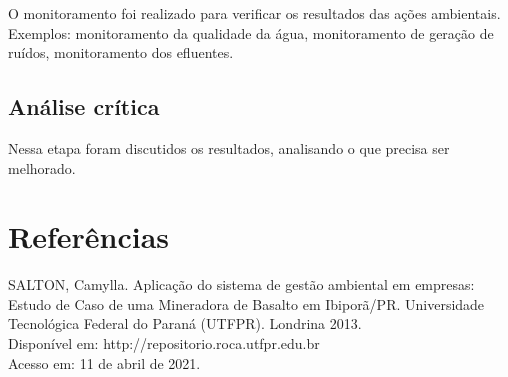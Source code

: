 \documentclass[a4paper, 12pt]{article}
\begin{document}
    \par O monitoramento foi realizado para verificar os resultados das ações ambientais. Exemplos: monitoramento da qualidade da água, monitoramento de geração de ruídos, monitoramento dos efluentes.

    \subsection{Análise crítica}

    \par Nessa etapa foram discutidos os resultados, analisando o que precisa ser melhorado.

    \section{Referências}
    
    \noindent SALTON, Camylla. Aplicação do sistema de gestão ambiental em empresas: Estudo de Caso de uma Mineradora de Basalto em Ibiporã/PR. Universidade Tecnológica Federal do Paraná (UTFPR). Londrina 2013.
    \\
    \noindent Disponível em: http://repositorio.roca.utfpr.edu.br
    \\
    \noindent Acesso em: 11 de abril de 2021.
\end{document}
